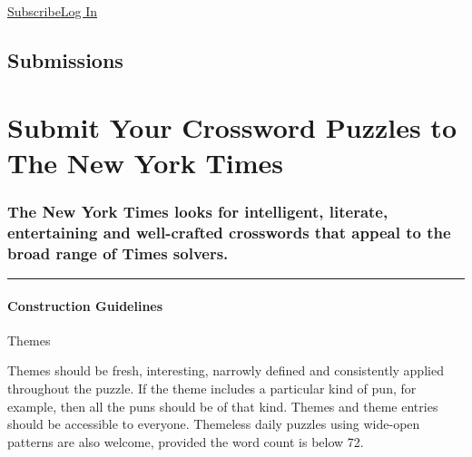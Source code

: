 \href{https://www.nytimes3xbfgragh.onion/subscription/games?campaignId=4QHQ8}{Subscribe}\href{https://myaccount.nytimes3xbfgragh.onion/auth/login?redirect_uri=https\%3A\%2F\%2Fwww.nytimes3xbfgragh.onion\%2Fpuzzles\%2Fsubmissions\%2Fcrossword\&response_type=cookie\&client_id=games\&application=crosswords\&asset=navigation-bar}{Log
In}

\hypertarget{submissions}{%
\subsection{Submissions}\label{submissions}}

\hypertarget{submit-your-crossword-puzzles-to-the-new-york-times}{%
\section{Submit Your Crossword Puzzles to The New York
Times}\label{submit-your-crossword-puzzles-to-the-new-york-times}}

\hypertarget{the-new-york-times-looks-for-intelligent-literate-entertaining-and-well-crafted-crosswords-that-appeal-to-the-broad-range-of-times-solvers}{%
\subsubsection{The New York Times looks for intelligent, literate,
entertaining and well-crafted crosswords that appeal to the broad range
of Times
solvers.}\label{the-new-york-times-looks-for-intelligent-literate-entertaining-and-well-crafted-crosswords-that-appeal-to-the-broad-range-of-times-solvers}}

\begin{center}\rule{0.5\linewidth}{\linethickness}\end{center}

\hypertarget{construction-guidelines}{%
\paragraph{Construction Guidelines}\label{construction-guidelines}}

Themes

Themes should be fresh, interesting, narrowly defined and consistently
applied throughout the puzzle. If the theme includes a particular kind
of pun, for example, then all the puns should be of that kind. Themes
and theme entries should be accessible to everyone. Themeless daily
puzzles using wide-open patterns are also welcome, provided the word
count is below 72.


